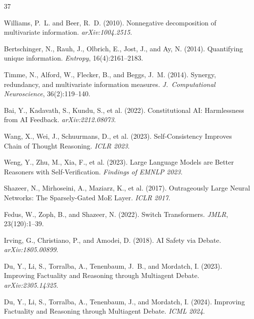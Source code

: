\documentclass[11pt,a4paper]{article}
\theoremstyle{definition}
\begin{document}
\begin{thebibliography}{37}

Williams, P.~L. and Beer, R.~D. (2010).
\newblock Nonnegative decomposition of multivariate information.
\newblock \emph{arXiv:1004.2515}.

Bertschinger, N., Rauh, J., Olbrich, E., Jost, J., and Ay, N. (2014).
\newblock Quantifying unique information.
\newblock \emph{Entropy}, 16(4):2161--2183.

Timme, N., Alford, W., Flecker, B., and Beggs, J.~M. (2014).
\newblock Synergy, redundancy, and multivariate information measures.
\newblock \emph{J.\ Computational Neuroscience}, 36(2):119--140.

Bai, Y., Kadavath, S., Kundu, S., et al. (2022).
\newblock Constitutional AI: Harmlessness from AI Feedback.
\newblock \emph{arXiv:2212.08073}.

Wang, X., Wei, J., Schuurmans, D., et al. (2023).
\newblock Self-Consistency Improves Chain of Thought Reasoning.
\newblock \emph{ICLR 2023}.

Weng, Y., Zhu, M., Xia, F., et al. (2023).
\newblock Large Language Models are Better Reasoners with Self-Verification.
\newblock \emph{Findings of EMNLP 2023}.

Shazeer, N., Mirhoseini, A., Maziarz, K., et al. (2017).
\newblock Outrageously Large Neural Networks: The Sparsely-Gated MoE Layer.
\newblock \emph{ICLR 2017}.

Fedus, W., Zoph, B., and Shazeer, N. (2022).
\newblock Switch Transformers.
\newblock \emph{JMLR}, 23(120):1--39.

Irving, G., Christiano, P., and Amodei, D. (2018).
\newblock AI Safety via Debate.
\newblock \emph{arXiv:1805.00899}.

Du, Y., Li, S., Torralba, A., Tenenbaum, J.~B., and Mordatch, I. (2023).
\newblock Improving Factuality and Reasoning through Multiagent Debate.
\newblock \emph{arXiv:2305.14325}.

Du, Y., Li, S., Torralba, A., Tenenbaum, J., and Mordatch, I. (2024).
\newblock Improving Factuality and Reasoning through Multiagent Debate.
\newblock \emph{ICML 2024}.


\end{thebibliography}
\end{document}

